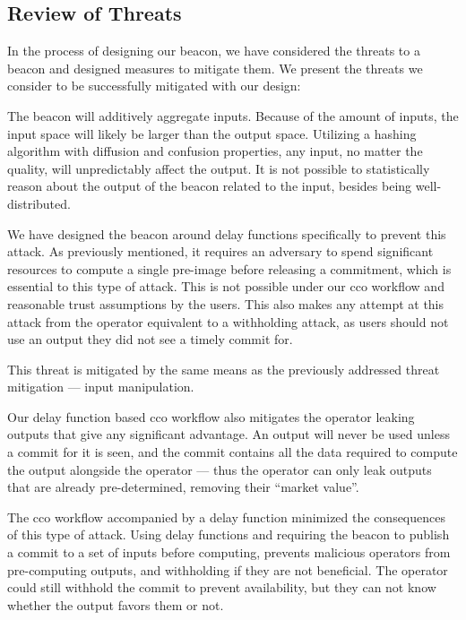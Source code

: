 \subsection{Review of Threats}
In the process of designing our beacon, we have considered the threats to a beacon and designed measures to mitigate them.
We present the threats we consider to be successfully mitigated with our design:

The beacon will additively aggregate inputs.
Because of the amount of inputs, the input space will likely be larger than the output space.
Utilizing a hashing algorithm with diffusion and confusion properties, any input, no matter the quality, will unpredictably affect the output.
It is not possible to statistically reason about the output of the beacon related to the input, besides being well-distributed.

We have designed the beacon around delay functions specifically to prevent this attack.
As previously mentioned, it requires an adversary to spend significant resources to compute a single pre-image before releasing a commitment, which is essential to this type of attack. This is not possible under our \gls{cco} workflow and reasonable trust assumptions by the users.
This also makes any attempt at this attack from the operator equivalent to a withholding attack, as users should not use an output they did not see a timely commit for.

This threat is mitigated by the same means as the previously addressed threat mitigation --- input manipulation.

Our delay function based \gls{cco} workflow also mitigates the operator leaking outputs that give any significant advantage.
An output will never be used unless a commit for it is seen, and the commit contains all the data required to compute the output alongside the operator --- thus the operator can only leak outputs that are already pre-determined, removing their \enquote{market value}.

The \gls{cco} workflow accompanied by a delay function minimized the consequences of this type of attack.
Using delay functions and requiring the beacon to publish a commit to a set of inputs before computing, prevents malicious operators from pre-computing outputs, and withholding if they are not beneficial.
The operator could still withhold the commit to prevent availability, but they can not know whether the output favors them or not.

